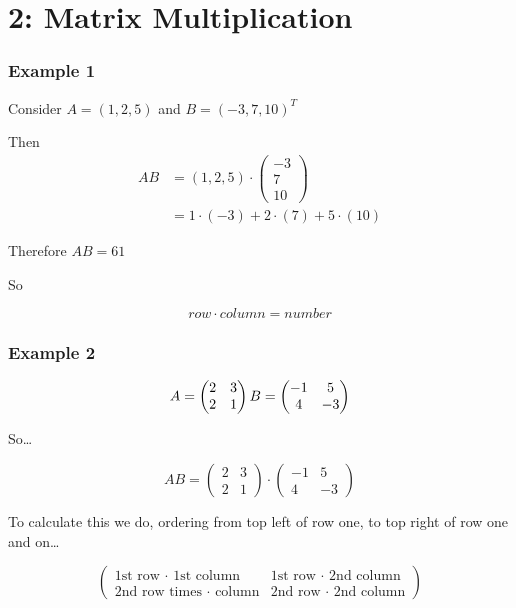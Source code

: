 \documentclass[a4paper]{article}
\begin{document}
\part*{2: Matrix Multiplication}

\section*{Example 1}
Consider $A = (1, 2, 5)$ and $B = (-3, 7, 10)^T$

Then
\[
	\begin{aligned}
	AB &= (1, 2, 5) \cdot 
	\begin{pmatrix}
		-3\\7\\10
	\end{pmatrix} \\
	&= 1 \cdot (-3) + 2 \cdot (7) + 5 \cdot (10)
	\end{aligned}
\]

Therefore $AB = 61$

So

\[row \cdot column = number\]

\section*{Example 2}
\[
A = 
\begin{pmatrix}
	2&3\\2&1
\end{pmatrix} \\
B = 
\begin{pmatrix}
	-1&5\\4&-3
\end{pmatrix}
\]

So\ldots

\[AB = 
\begin{pmatrix}
	2&3\\2&1
\end{pmatrix} \cdot 
\begin{pmatrix}
	-1&5\\4&-3
\end{pmatrix}
\]

To calculate this we do, ordering from top left of row one, to top right of row one and on\ldots

\[
	\begin{pmatrix}
		\text{1st row $\cdot$ 1st column} & \text{1st row $\cdot$ 2nd column} \\
		\text{2nd row times $\cdot$ column} & \text{2nd row $\cdot$ 2nd column}
	\end{pmatrix}
\]
\end{document}
